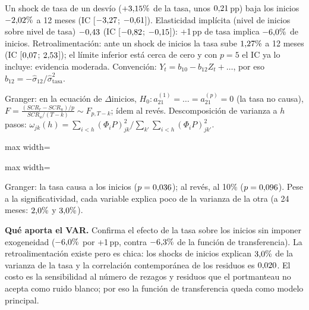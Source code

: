 \documentclass[11pt,a4paper]{article}
\newcommand{\R}{../salidas}
\newcommand{\tabla}[2]{\begin{table}[H]\centering\small\begin{adjustbox}{max width=\linewidth}\end{adjustbox}\caption{#2}\end{table}}
\begin{document}
\par Un shock de tasa de un desv\'io ($+3{,}15\%$ de la tasa, unos $0{,}21$\,pp) baja los inicios $-2{,}02\%$ a 12 meses (IC [$-3{,}27$; $-0{,}61$]). Elasticidad impl\'icita (nivel de inicios sobre nivel de tasa) $-0{,}43$ (IC [$-0{,}82$; $-0{,}15$]): +1\,pp de tasa implica $-6{,}0\%$ de inicios. Retroalimentaci\'on: ante un shock de inicios la tasa sube $1{,}27\%$ a 12 meses (IC [$0{,}07$; $2{,}53$]); el l\'imite inferior est\'a cerca de cero y con $p=5$ el IC ya lo incluye: evidencia moderada. Convenci\'on: $Y_t=b_{10}-b_{12}Z_t+\dots$, por eso $\hat b_{12}=-\hat\sigma_{12}/\hat\sigma^2_{\text{tasa}}$.
\par Granger: en la ecuaci\'on de $\Delta\text{inicios}$, $H_0:a^{(1)}_{21}=\dots=a^{(p)}_{21}=0$ (la tasa no causa), $F=\frac{(SCR_r-SCR_u)/p}{SCR_u/(T-k)}\sim F_{p,T-k}$; \'idem al rev\'es. Descomposici\'on de varianza a $h$ pasos: $\omega_{jk}(h)=\sum_{i<h}(\Phi_iP)^2_{jk}\big/\sum_{k'}\sum_{i<h}(\Phi_iP)^2_{jk'}$.
\tabla{10_granger.tex}{Causalidad de Granger.}
\tabla{10_fevd.tex}{Descomposici\'on de la varianza del error de pron\'ostico.}
\par Granger: la tasa causa a los inicios ($p=0{,}036$); al rev\'es, al 10\% ($p=0{,}096$). Pese a la significatividad, cada variable explica poco de la varianza de la otra (a 24 meses: $2{,}0\%$ y $3{,}0\%$).

\textbf{Qu\'e aporta el VAR.} Confirma el efecto de la tasa sobre los inicios sin imponer exogeneidad ($-6{,}0\%$ por +1\,pp, contra $-6{,}3\%$ de la funci\'on de transferencia). La retroalimentaci\'on existe pero es chica: los shocks de inicios explican $3{,}0\%$ de la varianza de la tasa y la correlaci\'on contempor\'anea de los residuos es $0{,}020$. El costo es la sensibilidad al n\'umero de rezagos y residuos que el portmanteau no acepta como ruido blanco; por eso la funci\'on de transferencia queda como modelo principal.

\end{document}
